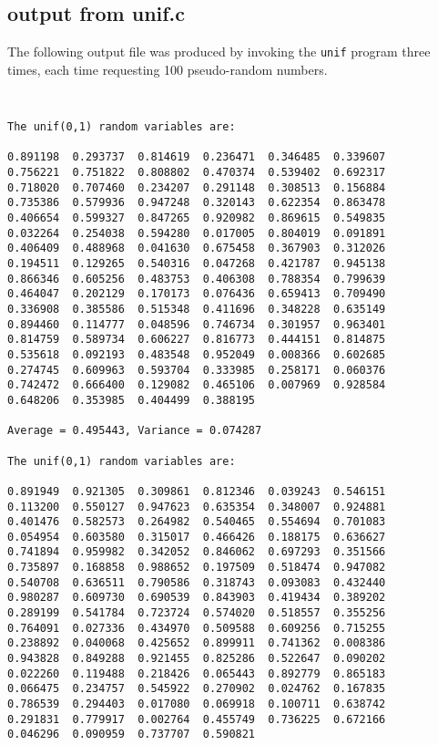\documentclass{article}
\begin{document}
\subsection{output from unif.c}
The following output file was produced by invoking the {\tt unif}
program three times, each time requesting 100 pseudo-random numbers.
{\tt
\begin{verbatim}
The unif(0,1) random variables are:

0.891198  0.293737  0.814619  0.236471  0.346485  0.339607  
0.756221  0.751822  0.808802  0.470374  0.539402  0.692317  
0.718020  0.707460  0.234207  0.291148  0.308513  0.156884  
0.735386  0.579936  0.947248  0.320143  0.622354  0.863478  
0.406654  0.599327  0.847265  0.920982  0.869615  0.549835  
0.032264  0.254038  0.594280  0.017005  0.804019  0.091891  
0.406409  0.488968  0.041630  0.675458  0.367903  0.312026  
0.194511  0.129265  0.540316  0.047268  0.421787  0.945138  
0.866346  0.605256  0.483753  0.406308  0.788354  0.799639  
0.464047  0.202129  0.170173  0.076436  0.659413  0.709490  
0.336908  0.385586  0.515348  0.411696  0.348228  0.635149  
0.894460  0.114777  0.048596  0.746734  0.301957  0.963401  
0.814759  0.589734  0.606227  0.816773  0.444151  0.814875  
0.535618  0.092193  0.483548  0.952049  0.008366  0.602685  
0.274745  0.609963  0.593704  0.333985  0.258171  0.060376  
0.742472  0.666400  0.129082  0.465106  0.007969  0.928584  
0.648206  0.353985  0.404499  0.388195  

Average = 0.495443, Variance = 0.074287

The unif(0,1) random variables are:

0.891949  0.921305  0.309861  0.812346  0.039243  0.546151  
0.113200  0.550127  0.947623  0.635354  0.348007  0.924881  
0.401476  0.582573  0.264982  0.540465  0.554694  0.701083  
0.054954  0.603580  0.315017  0.466426  0.188175  0.636627  
0.741894  0.959982  0.342052  0.846062  0.697293  0.351566  
0.735897  0.168858  0.988652  0.197509  0.518474  0.947082  
0.540708  0.636511  0.790586  0.318743  0.093083  0.432440  
0.980287  0.609730  0.690539  0.843903  0.419434  0.389202  
0.289199  0.541784  0.723724  0.574020  0.518557  0.355256  
0.764091  0.027336  0.434970  0.509588  0.609256  0.715255  
0.238892  0.040068  0.425652  0.899911  0.741362  0.008386  
0.943828  0.849288  0.921455  0.825286  0.522647  0.090202  
0.022260  0.119488  0.218426  0.065443  0.892779  0.865183  
0.066475  0.234757  0.545922  0.270902  0.024762  0.167835  
0.786539  0.294403  0.017080  0.069918  0.100711  0.638742  
0.291831  0.779917  0.002764  0.455749  0.736225  0.672166  
0.046296  0.090959  0.737707  0.590821  


\end{verbatim}}
\end{document}
